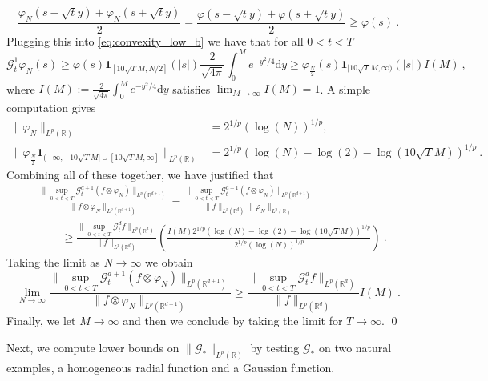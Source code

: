 \documentclass[a4paper, reqno]{amsart}
\theoremstyle{definition}
\newcommand{\dd}{{\mathrm d}}
\newcommand{\mG}{\mathcal{G}}
\begin{document}
$$\frac{\varphi_N(s-\sqrt{t}y)+\varphi_N(s+\sqrt{t}y)}{2}=\frac{\varphi(s-\sqrt{t}y)+\varphi(s+\sqrt{t}y)}{2}\geq \varphi(s)~. $$
Plugging this into \eqref{eq:convexity_low_b} we have that for all $0<t<T$
$$\mG_t^1\varphi_N (s) \geq \varphi(s)\mathbf{1}_{[ 10\sqrt{T}M,N/2]}(|s|) \frac{2}{\sqrt{4\pi}}\int_0^Me^{-y^2/4}\dd y\geq \varphi_{\frac{N}{2}}(s)\mathbf{1}_{[ 10\sqrt{T}M,\infty)}(|s|) I(M)~, $$
where $I(M):= \frac{2}{\sqrt{4\pi}}\int_0^Me^{-y^2/4}\dd y$ satisfies $\lim_{M\rightarrow\infty}I(M)=1$. A simple computation gives
\begin{align*}\|\varphi_N\|_{L^p(\mathbb{R})}&= 2^{1/p}(\log(N))^{1/p}, \\ \|\varphi_{\frac{N}{2}}\mathbf{1}_{(-\infty,-10\sqrt{T}M]\cup[ 10\sqrt{T}M,\infty]}\|_{L^p(\mathbb{R})}&= 2^{1/p}(\log(N)-\log(2)-\log(10\sqrt{T}M))^{1/p}~.\end{align*}
Combining all of these together, we have justified that
\begin{align*}
   & \frac{\|\sup_{0<t<T}\mG_t^{d+1}(f \otimes \varphi_N)\|_{L^p(\mathbb{R}^{d+1})}}{\|f\otimes \varphi_N\|_{L^p(\mathbb{R}^{d+1})}}  = 
    \frac{\|\sup_{0<t<T}\mG_t^{d+1}(f\otimes \varphi_N)\|_{L^p(\mathbb{R}^{d+1})}}{\|f\|_{L^p(\mathbb{R}^d)} \| \varphi_N\|_{L^p(\mathbb{R})}}\\
    & \qquad \geq  \frac{\|\sup_{0<t<T} \mG_t^{d}f\|_{L^p(\mathbb{R}^{d})}}{\|f\|_{L^p(\mathbb{R}^d)} } \left( \frac{I(M)2^{1/p}(\log(N)-\log(2)-\log(10\sqrt{T}M))^{1/p}}{2^{1/p}(\log(N))^{1/p}}\right)~.
\end{align*}
Taking the limit as $N\rightarrow\infty$ we obtain
$$\lim_{N\rightarrow\infty} \frac{\|\sup_{0<t<T}\mG_t^{d+1}(f \otimes \varphi_N)\|_{L^p(\mathbb{R}^{d+1})}}{\|f\otimes \varphi_N\|_{L^p(\mathbb{R}^{d+1})}} \geq \frac{\|\sup_{0<t<T}\mG_t^{d}f\|_{L^p(\mathbb{R}^{d})}}{\|f\|_{L^p(\mathbb{R}^d)} } I(M)~. $$
Finally, we let $M\rightarrow \infty$ and then we conclude by taking the limit for $T\rightarrow\infty$.
\qed 

Next, we compute lower bounds on $\|\mG_\ast\|_{L^p(\mathbb{R})}$ by testing $\mG_\ast$ on two natural examples, a homogeneous radial function and a Gaussian function.
\end{document}
